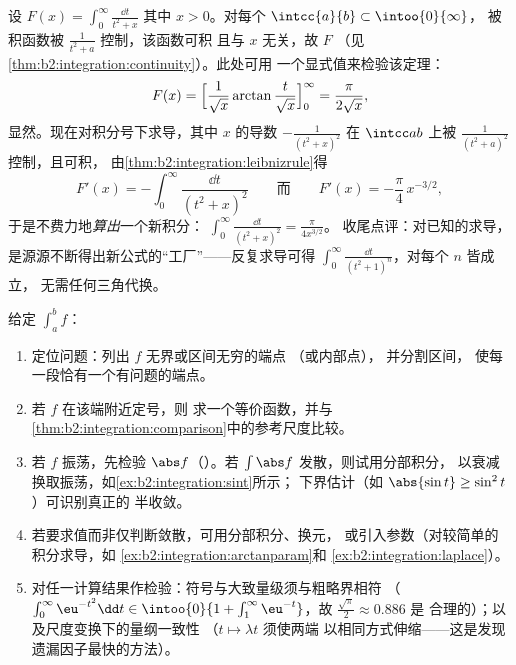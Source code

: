\begin{example}[含参积分的公式验证]\label{ex:b2:integration:arctanparam}
设 $F(x) = \displaystyle\int_0^\infty \frac{\dd t}{t^2 + x}$
其中 $x > 0$。对每个 $\intcc{a}{b} \subset \intoo{0}{\infty}$，
被积函数被 $\frac{1}{t^2 + a}$ 控制，该函数可积
且与 $x$ 无关，故 $F$ 
（见\cref{thm:b2:integration:continuity}）。此处可用
一个显式值来检验该定理：
\[
F(x) = \Bigl[\frac{1}{\sqrt x}\arctan\frac{t}{\sqrt
x}\Bigr]_0^\infty = \frac{\pi}{2\sqrt x} ,
\]
显然。现在对积分号下求导，其中
$x$ 的导数 $-\frac{1}{(t^2+x)^2}$ 在
$\intcc ab$ 上被 $\frac{1}{(t^2+a)^2}$ 控制，且可积，
由\cref{thm:b2:integration:leibnizrule}得
\[
F'(x) = -\int_0^\infty \frac{\dd t}{(t^2 + x)^2}
\qquad\text{而}\qquad
F'(x) = -\frac{\pi}{4}\,x^{-3/2} ,
\]
于是不费力地\emph{算出}一个新积分：
$\int_0^\infty\frac{\dd t}{(t^2+x)^2} = \frac{\pi}{4x^{3/2}}$。
收尾点评：对已知的求导，
是源源不断得出新公式的“工厂”——反复求导可得
$\int_0^\infty\frac{\dd t}{(t^2+1)^n}$，对每个 $n$ 皆成立，
无需任何三角代换。
\end{example}

\begin{method}[反常积分的研究]\label{met:b2:integration:study}
给定 $\int_a^b f$：
\begin{enumerate}
  \item 定位问题：列出 $f$ 无界或区间无穷的端点
        （或内部点），
        并分割区间，
        使每一段恰有一个有问题的端点。
  \item 若 $f$ 在该端附近定号，则
        求一个等价函数，并与
        \cref{thm:b2:integration:comparison}中的参考尺度比较。
  \item 若 $f$ 振荡，先检验 $\abs f$（）。若 $\int\abs f$ 发散，则试用分部积分，
        以衰减换取振荡，如\cref{ex:b2:integration:sint}所示；
        下界估计（如
        $\abs{\sin t} \geq \sin^2t$）可识别真正的
        半收敛。
  \item 若要求值而非仅判断敛散，可用分部积分、换元，
        或引入参数（对较简单的积分求导，如
        \cref{ex:b2:integration:arctanparam}和
        \cref{ex:b2:integration:laplace}）。
  \item 对任一计算结果作检验：符号与大致量级须与粗略界相符
        （$\int_0^\infty
        \eu^{-t^2}\dd t \in \intoo{0}{1 + \int_1^\infty
        \eu^{-t}}$，故 $\frac{\sqrt\pi}{2} \approx 0.886$ 是
        合理的）；以及尺度变换下的量纲一致性
        （$t \mapsto \lambda t$ 须使两端
        以相同方式伸缩——这是发现遗漏因子最快的方法）。
\end{enumerate}
\end{method}

